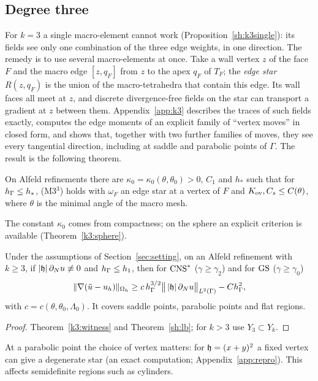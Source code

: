 \subsection{Degree three}
For $k=3$ a single macro-element cannot work (Proposition~\ref{sh:k3single}): its fields see only one combination of the three edge weights, in one direction. The remedy is to use several macro-elements at once. Take a wall vertex $z$ of the face $F$ and the macro edge $[z,q_F]$ from $z$ to the apex $q_F$ of $T_F$; the \emph{edge star} $R(z,q_F)$ is the union of the macro-tetrahedra that contain this edge. Its wall faces all meet at $z$, and discrete divergence-free fields on the star can transport a gradient at $z$ between them. Appendix~\ref{app:k3} describes the traces of such fields exactly, computes the edge moments of an explicit family of ``vertex moves'' in closed form, and shows that, together with two further families of moves, they see every tangential direction, including at saddle and parabolic points of $\Gamma$. The result is the following theorem.

\begin{theorem}[(M3$^3$) for $k=3$; Theorem~\ref{k3:witness}]
On Alfeld refinements there are $\kappa_0=\kappa_0(\theta,\theta_0)>0$, $C_1$ and $h_\ast$ such that for $h_\Gamma\le h_\ast$, (M3$^3$) holds with $\omega_F$ an edge star at a vertex of $F$ and $K_{\rm ov},C_s\le C(\theta)$, where $\theta$ is the minimal angle of the macro mesh.
\end{theorem}
The constant $\kappa_0$ comes from compactness; on the sphere an explicit criterion is available (Theorem~\ref{k3:sphere}).

\begin{theorem}\label{sh:k3main}
Under the assumptions of Section~\ref{sec:setting}, on an Alfeld refinement with $k\ge3$, if $|\mathfrak h|\,\partial_Nu\not\equiv0$ and $h_\Gamma\le h_1$, then for $\mathrm{CNS}^\ast$ ($\gamma\ge\gamma_2$) and for $\mathrm{GS}$ ($\gamma\ge\gamma_0$)
\[
\lVert \nabla(\tilde u-u_h)\rVert_{\Omega_h}\ge c\,h_\Gamma^{3/2}\bigl\|\,|\mathfrak h|\,\partial_Nu\bigr\|_{L^2(\Gamma)}-Ch_\Gamma^2,
\]
with $c=c(\theta,\theta_0,\Lambda_0)$. It covers saddle points, parabolic points and flat regions.
\end{theorem}

\begin{proof}
Theorem~\ref{k3:witness} and Theorem~\ref{sh:lb}; for $k>3$ use $Y_3\subset Y_k$.
\end{proof}
At a parabolic point the choice of vertex matters: for $\mathfrak h=(x+y)^2$ a fixed vertex can give a degenerate star (an exact computation; Appendix~\ref{app:repro}). This affects semidefinite regions such as cylinders.


